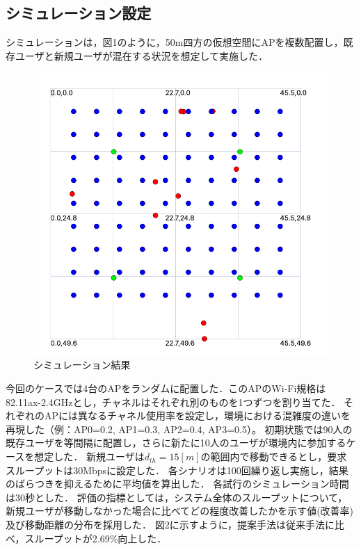 \documentclass[dvipdfmx,twocolumn]{jsarticle}
\begin{document}
\subsection{シミュレーション設定}
シミュレーションは，図1のように，50m四方の仮想空間にAPを複数配置し，既存ユーザと新規ユーザが混在する状況を想定して実施した．
\begin{figure}[H]
  \centering
  \includegraphics[width=0.8\linewidth, trim=0 40 0 40, clip]{simulation.png}
  \caption{シミュレーション結果}
\end{figure}
今回のケースでは4台のAPをランダムに配置した．このAPのWi-Fi規格は82.11ax-2.4GHzとし，チャネルはそれぞれ別のものを1つずつを割り当てた．
それぞれのAPには異なるチャネル使用率を設定し，環境における混雑度の違いを再現した（例：AP0=0.2, AP1=0.3, AP2=0.4, AP3=0.5）。
初期状態では90人の既存ユーザを等間隔に配置し，さらに新たに10人のユーザが環境内に参加するケースを想定した．
新規ユーザは$d_{th}=15[m]$の範囲内で移動できるとし，要求スループットは30Mbpsに設定した．
各シナリオは100回繰り返し実施し，結果のばらつきを抑えるために平均値を算出した．
各試行のシミュレーション時間は30秒とした．
評価の指標としては，システム全体のスループットについて，新規ユーザが移動しなかった場合に比べてどの程度改善したかを示す値(改善率)及び移動距離の分布を採用した．
図2に示すように，提案手法は従来手法に比べ，スループットが2.69\%向上した．
\end{document}
